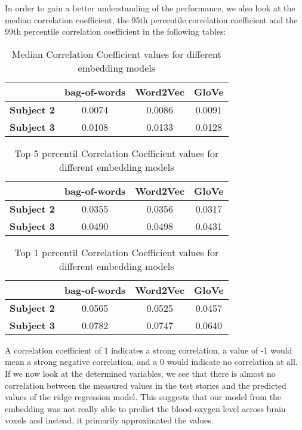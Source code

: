 \documentclass[12pt,letterpaper]{article}
\begin{document}
In order to gain a better understanding of the performance, we also look at the median correlation coefficient, the 95th percentile correlation coefficient and the 99th percentile correlation coefficient in the following tables:

\begin{table}[H]
    \centering
    \begin{tabular}{l c c c}
        \hline
          & \textbf{bag-of-words} & \textbf{Word2Vec} & \textbf{GloVe} \\
        \hline
        \textbf{Subject 2} & 0.0074 & 0.0086 & 0.0091 \\
        \textbf{Subject 3} & 0.0108 & 0.0133 & 0.0128 \\
        \hline
    \end{tabular}
    \caption{Median Correlation Coefficient values for different embedding models}
    \label{tab:accuracy_values}
\end{table}

\begin{table}[H]
    \centering
    \begin{tabular}{l c c c}
        \hline
          & \textbf{bag-of-words} & \textbf{Word2Vec} & \textbf{GloVe} \\
        \hline
        \textbf{Subject 2} & 0.0355 & 0.0356 & 0.0317 \\
        \textbf{Subject 3} & 0.0490 & 0.0498 & 0.0431 \\
        \hline
    \end{tabular}
    \caption{Top 5 percentil Correlation Coefficient values for different embedding models}
    \label{tab:accuracy_values}
\end{table}

\begin{table}[H]
    \centering
    \begin{tabular}{l c c c}
        \hline
          & \textbf{bag-of-words} & \textbf{Word2Vec} & \textbf{GloVe} \\
        \hline
        \textbf{Subject 2} & 0.0565 & 0.0525 & 0.0457 \\
        \textbf{Subject 3} & 0.0782 & 0.0747 & 0.0640 \\
        \hline
    \end{tabular}
    \caption{Top 1 percentil Correlation Coefficient values for different embedding models}
    \label{tab:accuracy_values}
\end{table}

A correlation coefficient of 1 indicates a strong correlation, a value of -1 would mean a strong negative correlation, and a 0 would indicate no correlation at all. If we now look at the determined variables, we see that there is almost no correlation between the measured values in the test stories and the predicted values of the ridge regression model. This suggests that our model from the embedding was not really able to predict the blood-oxygen level across brain voxels and instead, it primarily approximated the values.
\end{document}
